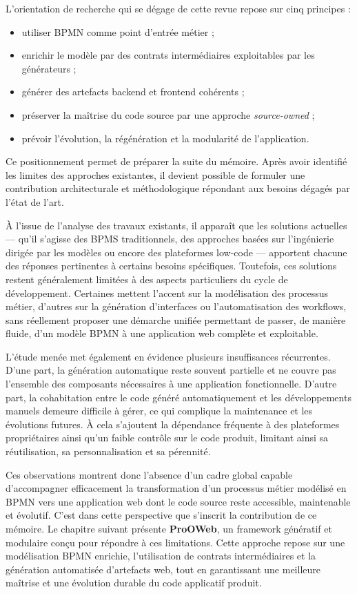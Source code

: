 L'orientation de recherche qui se dégage de cette revue repose sur cinq principes :

\begin{itemize}
    \item utiliser BPMN comme point d'entrée métier ;
    \item enrichir le modèle par des contrats intermédiaires exploitables par les générateurs ;
    \item générer des artefacts backend et frontend cohérents ;
    \item préserver la maîtrise du code source par une approche \textit{source-owned} ;
    \item prévoir l'évolution, la régénération et la modularité de l'application.
\end{itemize}

Ce positionnement permet de préparer la suite du mémoire. Après avoir identifié les limites des approches existantes, il devient possible de formuler une contribution architecturale et méthodologique répondant aux besoins dégagés par l'état de l'art.


À l’issue de l’analyse des travaux existants, il apparaît que les solutions actuelles — qu’il s’agisse des BPMS traditionnels, des approches basées sur l’ingénierie dirigée par les modèles ou encore des plateformes low-code — apportent chacune des réponses pertinentes à certains besoins spécifiques. Toutefois, ces solutions restent généralement limitées à des aspects particuliers du cycle de développement. Certaines mettent l’accent sur la modélisation des processus métier, d’autres sur la génération d’interfaces ou l’automatisation des workflows, sans réellement proposer une démarche unifiée permettant de passer, de manière fluide, d’un modèle BPMN à une application web complète et exploitable.

L’étude menée met également en évidence plusieurs insuffisances récurrentes. D’une part, la génération automatique reste souvent partielle et ne couvre pas l’ensemble des composants nécessaires à une application fonctionnelle. D’autre part, la cohabitation entre le code généré automatiquement et les développements manuels demeure difficile à gérer, ce qui complique la maintenance et les évolutions futures. À cela s’ajoutent la dépendance fréquente à des plateformes propriétaires ainsi qu’un faible contrôle sur le code produit, limitant ainsi sa réutilisation, sa personnalisation et sa pérennité.

Ces observations montrent donc l’absence d’un cadre global capable d’accompagner efficacement la transformation d’un processus métier modélisé en BPMN vers une application web dont le code source reste accessible, maintenable et évolutif. C’est dans cette perspective que s’inscrit la contribution de ce mémoire. Le chapitre suivant présente \textbf{ProOWeb}, un framework génératif et modulaire conçu pour répondre à ces limitations. Cette approche repose sur une modélisation BPMN enrichie, l’utilisation de contrats intermédiaires et la génération automatisée d’artefacts web, tout en garantissant une meilleure maîtrise et une évolution durable du code applicatif produit.
